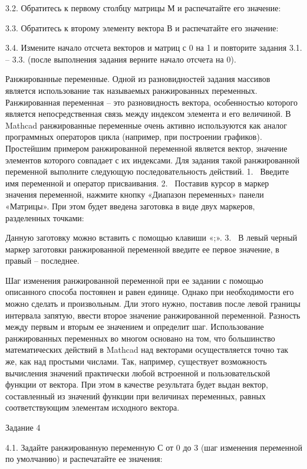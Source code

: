 3.2. Обратитесь к первому столбцу матрицы М и распечатайте его значение:



3.3. Обратитесь к второму элементу вектора В и распечатайте его значение:



3.4. Измените начало отсчета векторов и матриц с 0 на 1 и повторите задания 3.1. – 3.3. (после выполнения задания верните начало отсчета на 0).

Ранжированные переменные. Одной из разновидностей задания массивов является использование так называемых ранжированных переменных. Ранжированная переменная – это разновидность вектора, особенностью которого является непосредственная связь между индексом элемента и его величиной. В Mathcad ранжированные переменные очень активно используются как аналог программных операторов цикла (например, при построении графиков).
Простейшим примером ранжированной переменной является вектор, значение элементов которого совпадает с их индексами. Для задания такой ранжированной переменной выполните следующую последовательность действий.
1.  Введите имя переменной и оператор присваивания.
2.  Поставив курсор в маркер значения переменной, нажмите кнопку «Диапазон переменных» панели «Матрицы». При этом будет введена заготовка в виде двух маркеров, разделенных точками:

Данную заготовку можно вставить с помощью клавиши «;».
3.  В левый черный маркер заготовки ранжированной переменной введите ее первое значение, в правый – последнее.

Шаг изменения ранжированной переменной при ее задании с помощью описанного способа постоянен и равен единице. Однако при необходимости его можно сделать и произвольным. Дли этого нужно, поставив после левой границы интервала запятую, ввести второе значение ранжированной переменной. Разность между первым и вторым ее значением и определит шаг. 
Использование ранжированных переменных во многом основано на том, что большинство математических действий в Mathcad над векторами осуществляется точно так же, как над простыми числами. Так, например, существует возможность вычисления значений практически любой встроенной и пользовательской функции от вектора. При этом в качестве результата будет выдан вектор, составленный из значений функции при величинах переменных, равных соответствующим элементам исходного вектора.

Задание 4

4.1. Задайте ранжированную переменную С от 0 до 3 (шаг изменения переменной по умолчанию) и распечатайте ее значения:



